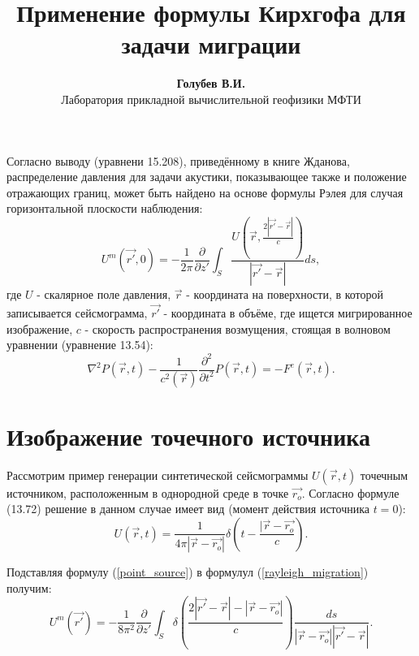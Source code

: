 \documentclass{article}
\begin{document}
\title{Применение формулы Кирхгофа для задачи миграции}
\author{\textbf{Голубев В.И.} \\ Лаборатория прикладной вычислительной геофизики МФТИ}
\maketitle
Согласно выводу (уравнени 15.208), приведённому в книге Жданова, распределение давления для
задачи акустики, показывающее также и положение отражающих границ,
может быть найдено на основе формулы Рэлея для случая горизонтальной плоскости
наблюдения:
\begin{equation}
\label{rayleigh_migration}
U^m(\vec{r'},0) = -\frac{1}{2\pi}\frac{\partial}{\partial z'}
	\int_S \frac{U(\vec{r},\frac{2|\vec{r'}-\vec{r}|}{c})}{|\vec{r'}-\vec{r}|}ds,
\end{equation}
где $U$ - скалярное поле давления, $\vec{r}$ - координата на поверхности, в которой записывается
сейсмограмма, $\vec{r'}$ - координата в объёме, где ищется мигрированное изображение, $c$ - скорость распространения возмущения, стоящая в волновом уравнении (уравнение 13.54):
\begin{equation}
\label{wave_equation}
\nabla^2P(\vec{r},t) - \frac{1}{c^2(\vec{r})}\frac{\partial^2}{\partial t^2}
	P(\vec{r},t) = - F^e(\vec{r},t).
\end{equation}

\section{Изображение точечного источника}

Рассмотрим пример генерации синтетической сейсмограммы $U(\vec{r}, t)$ точечным источником, расположенным в однородной среде в точке $\vec{r_o}$.
Согласно формуле (13.72) решение в данном случае имеет вид (момент действия источника $t = 0$):
\begin{equation}
\label{point_source}
U(\vec{r}, t) = \frac{1}{4\pi|\vec{r} - \vec{r_o}|}\delta(t - \frac{|\vec{r} - \vec{r_o}}{c}).
\end{equation}

Подставляя формулу (\ref{point_source}) в формулул (\ref{rayleigh_migration}) получим:
\begin{equation}
\label{point_source_migrated}
U^m(\vec{r'}) = -\frac{1}{8\pi^2}\frac{\partial}{\partial z'}\int_S \delta(\frac{2|\vec{r'} - \vec{r}| - |\vec{r} - \vec{r_o}|}{c})\frac{ds}{|\vec{r} - \vec{r_o}||\vec{r'} - \vec{r}|}.
\end{equation}
\end{document}
